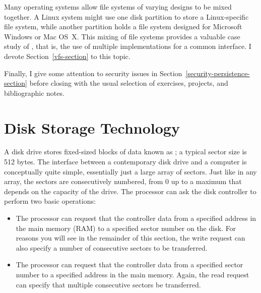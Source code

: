 Many operating systems allow file systems of varying designs to be
mixed together.  A Linux system might use one disk
partition to store a Linux-specific file system, while another
partition holds a file system designed for Microsoft Windows or Mac
OS~X.  This mixing of file systems provides a valuable case study of
, that is, the use of multiple implementations for a
common interface.  I devote
Section~\ref{vfs-section} to this topic.

Finally, I give some attention to security issues in Section~\ref{security-persistence-section} before closing
with the usual selection of exercises, projects, and bibliographic
notes.

\section{Disk Storage Technology}\label{disk-storage-technology-section}

A disk drive stores fixed-sized blocks of data known as
; a typical sector size is 512 bytes.  The interface
between a contemporary disk drive and a computer is conceptually quite
simple, essentially just a large array of sectors.  Just like in any
array, the sectors are consecutively numbered, from 0 up to a maximum
that depends on the capacity of the drive.  The processor can ask the
disk controller to perform two basic operations:
\begin{itemize}
\item
The processor can request that the controller  data from a specified address in the
main memory (RAM) to a specified sector number on the
disk.  For reasons you will see in the remainder of this section, the write request can also
specify a number of consecutive sectors to be transferred.
\item
The processor can request that the controller  data from a specified sector number to a specified
address in the main memory.  Again, the
read request can specify that multiple consecutive sectors be
transferred.
\end{itemize}

